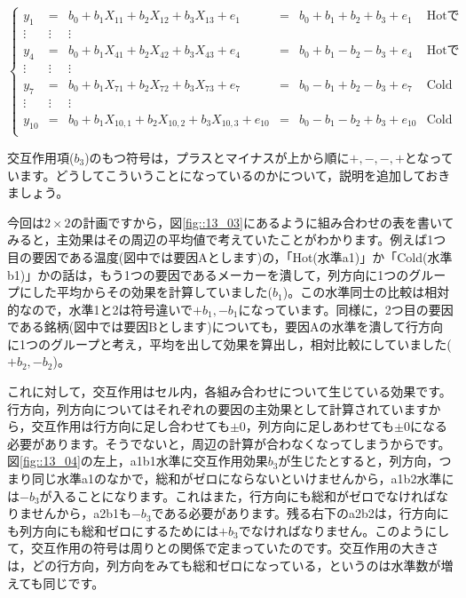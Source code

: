 \documentclass{ltjbook}
\begin{document}
\[
\label{eq13_05}
\left\{ 
  \begin{array}{cccccc}
    y_1 &=& b_0 + b_1 X_{11} + b_2 X_{12} + b_3 X_{13}+ e_1 &= &b_0 + b_1 + b_2  + b_3 + e_1 & \mbox{Hotで銘柄A}\\
    \vdots& \vdots  & \vdots \\
    y_4 &=& b_0 + b_1 X_{41} + b_2 X_{42} + b_3 X_{43}+ e_4 &= &b_0 + b_1 - b_2 - b_3 + e_4 & \mbox{Hotで銘柄B}\\
    \vdots &\vdots & \vdots \\
    y_7 &=& b_0 + b_1 X_{71} + b_2 X_{72} + b_3 X_{73}+ e_7&=& b_0 - b_1 + b_2 - b_3 + e_7 & \mbox{Coldで銘柄A}\\
    \vdots &\vdots & \vdots \\
    y_{10} &=& b_0 + b_1 X_{10,1} + b_2 X_{10,2} + b_3 X_{10,3}+ e_{10} &=& b_0 - b_1 - b_2+ b_3  + e_{10} & \mbox{Coldで銘柄B}\\
  \end{array}
\right .
\]

交互作用項($b_3$)のもつ符号は，プラスとマイナスが上から順に$+,-,-,+$となっています。どうしてこういうことになっているのかについて，説明を追加しておきましょう。

今回は$2\times2$の計画ですから，図\ref{fig::13_03}にあるように組み合わせの表を書いてみると，主効果はその周辺の平均値で考えていたことがわかります。例えば1つ目の要因である温度(図中では要因Aとします)の，「Hot(水準a1)」か「Cold(水準b1)」かの話は，もう1つの要因であるメーカーを潰して，列方向に1つのグループにした平均からその効果を計算していました($b_1$)。この水準同士の比較は相対的なので，水準1と2は符号違いで$+b_1,-b_1$になっています。同様に，2つ目の要因である銘柄(図中では要因Bとします)についても，要因Aの水準を潰して行方向に1つのグループと考え，平均を出して効果を算出し，相対比較にしていました($+b_2,-b_2$)。

これに対して，交互作用はセル内，各組み合わせについて生じている効果です。行方向，列方向についてはそれぞれの要因の主効果として計算されていますから，交互作用は行方向に足し合わせても$\pm 0$，列方向に足しあわせても$\pm 0$になる必要があります。そうでないと，周辺の計算が合わなくなってしまうからです。図\ref{fig::13_04}の左上，a1b1水準に交互作用効果$b_3$が生じたとすると，列方向，つまり同じ水準a1のなかで，総和がゼロにならないといけませんから，a1b2水準には$-b_3$が入ることになります。これはまた，行方向にも総和がゼロでなければなりませんから，a2b1も$-b_3$である必要があります。残る右下のa2b2は，行方向にも列方向にも総和ゼロにするためには$+b_3$でなければなりません。このようにして，交互作用の符号は周りとの関係で定まっていたのです。交互作用の大きさは，どの行方向，列方向をみても総和ゼロになっている，というのは水準数が増えても同じです。
\end{document}

